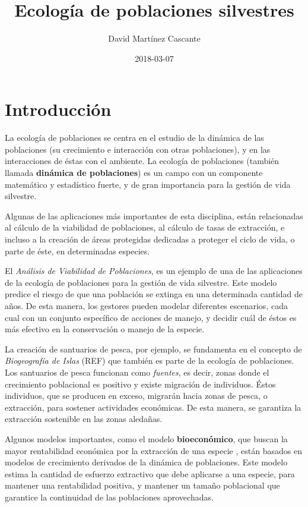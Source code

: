 \documentclass[12pt,letterpaper,]{book}
\title{Ecología de poblaciones silvestres}
\author{David Martínez Cascante}
\date{2018-03-07}
\begin{document}
\maketitle

{
\hypersetup{linkcolor=black}
\setcounter{tocdepth}{1}
\tableofcontents
}
\chapter{Introducción}\label{intro}

La ecología de poblaciones se centra en
el estudio de la dinámica de las
poblaciones (su crecimiento e
interacción con otras poblaciones), y en las interacciones de éstas con
el ambiente. La ecología de poblaciones (también llamada
\textbf{dinámica de poblaciones}) es un campo con un componente
matemático y estadístico fuerte, y de gran importancia para la gestión
de vida silvestre.

Algunas de las aplicaciones más importantes de esta disciplina, están
relacionadas al cálculo de la viabilidad de poblaciones, al cálculo de
tasas de extracción, e incluso a la creación de áreas protegidas
dedicadas a proteger el ciclo de vida, o parte de éste, en determinadas
especies.

El \emph{Análisis de Viabilidad de Poblaciones}, es un ejemplo de una de
las aplicaciones de la ecología de poblaciones para la gestión de vida
silvestre. Este modelo predice el riesgo de que una población se extinga
en una determinada cantidad de años. De esta manera, los gestores pueden
modelar diferentes escenarios, cada cual con un conjunto específico de
acciones de manejo, y decidir cuál de éstos es más efectivo en la
conservación o manejo de la especie.

La creación de santuarios de pesca, por ejemplo, se fundamenta en el
concepto de \emph{Biogeografía de Islas} (REF) que también es parte de
la ecología de poblaciones. Los santuarios de pesca funcionan como
\emph{fuentes}, es decir, zonas donde el crecimiento poblacional es
positivo y existe migración de individuos. Éstos individuos, que se
producen en exceso, migrarán hacia zonas de pesca, o extracción, para
sostener actividades económicas. De esta manera, se garantiza la
extracción sostenible en las zonas aledañas.

Algunos modelos importantes, como el modelo \textbf{bioeconómico}, que
buscan la mayor rentabilidad económica por la extracción de una especie
\citep{Grafton2006}, están basados en modelos de crecimiento derivados
de la dinámica de poblaciones. Este modelo estima la cantidad de
esfuerzo extractivo que debe aplicarse a una especie, para mantener una
rentabilidad positiva, y mantener un tamaño poblacional que garantice la
continuidad de las poblaciones aprovechadas.
\end{document}

